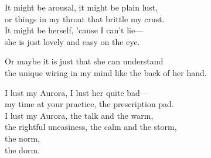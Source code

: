 \begin{lyrics}
It might be arousal, it might be plain lust,\\
or things in my throat that brittle my crust.\\
It might be herself, 'cause I can't lie—\\
she is just lovely and easy on the eye.

Or maybe it is just that she can understand\\
the unique wiring in my mind like the back of her hand.

I lust my Aurora, I lust her quite bad—\\
my time at your practice, the prescription pad.\\
I lust my Aurora, the talk and the warm,\\
the rightful uneasiness, the calm and the storm,\\
the norm,\\
the dorm.
\end{lyrics}

